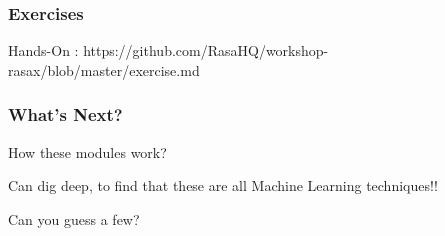 \begin{frame}[fragile]\frametitle{Exercises}
Hands-On : https://github.com/RasaHQ/workshop-rasax/blob/master/exercise.md

\end{frame}

\begin{frame}[fragile]\frametitle{What's Next?}
How these modules work? 

Can dig deep, to find that these are all Machine Learning techniques!!

Can you guess a few?

\end{frame}
